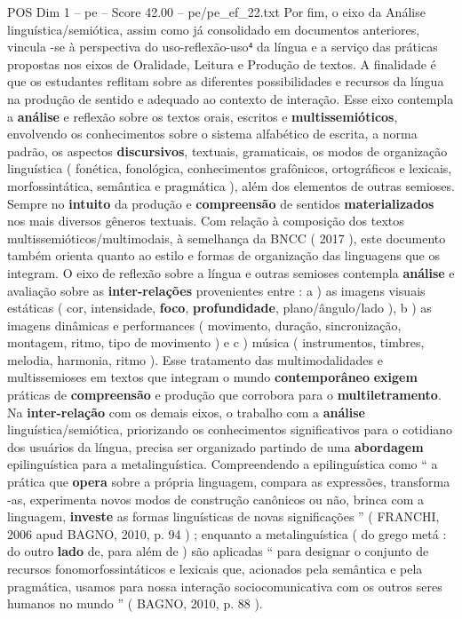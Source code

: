 \begin{textsample}{POS Dim 1 – pe – Score 42.00 – pe/pe\_ef\_22.txt}
Por fim, o eixo da Análise linguística/semiótica, assim como já consolidado em documentos anteriores, vincula -se à perspectiva do uso-reflexão-uso⁴ da língua e a serviço das práticas propostas nos eixos de Oralidade, Leitura e Produção de textos.
A finalidade é que os estudantes reflitam sobre as diferentes possibilidades e recursos da língua na produção de sentido e adequado ao contexto de interação.
Esse eixo contempla a \textbf{análise} e reflexão sobre os textos orais, escritos e \textbf{multissemióticos}, envolvendo os conhecimentos sobre o sistema alfabético de escrita, a norma padrão, os aspectos \textbf{discursivos}, textuais, gramaticais, os modos de organização linguística ( fonética, fonológica, conhecimentos grafônicos, ortográficos e lexicais, morfossintática, semântica e pragmática ), além dos elementos de outras semioses.
Sempre no \textbf{intuito} da produção e \textbf{compreensão} de sentidos \textbf{materializados} nos mais diversos gêneros textuais.
Com relação à composição dos textos multissemióticos/multimodais, à semelhança da BNCC ( 2017 ), este documento também orienta quanto ao estilo e formas de organização das linguagens que os integram.
O eixo de reflexão sobre a língua e outras semioses contempla \textbf{análise} e avaliação sobre as \textbf{inter-relações} provenientes entre : a ) as imagens visuais estáticas ( cor, intensidade, \textbf{foco}, \textbf{profundidade}, plano/ângulo/lado ), b ) as imagens dinâmicas e performances ( movimento, duração, sincronização, montagem, ritmo, tipo de movimento ) e c ) música ( instrumentos, timbres, melodia, harmonia, ritmo ).
Esse tratamento das multimodalidades e multissemioses em textos que integram o mundo \textbf{contemporâneo} \textbf{exigem} práticas de \textbf{compreensão} e produção que corrobora para o \textbf{multiletramento}.
Na \textbf{inter-relação} com os demais eixos, o trabalho com a \textbf{análise} linguística/semiótica, priorizando os conhecimentos significativos para o cotidiano dos usuários da língua, precisa ser organizado partindo de uma \textbf{abordagem} epilinguística para a metalinguística.
Compreendendo a epilinguística como “ a prática que \textbf{opera} sobre a própria linguagem, compara as expressões, transforma -as, experimenta novos modos de construção canônicos ou não, brinca com a linguagem, \textbf{investe} as formas linguísticas de novas significações ” ( FRANCHI, 2006 apud BAGNO, 2010, p. 94 ) ; enquanto a metalinguística ( do grego metá : do outro \textbf{lado} de, para além de ) são aplicadas “ para designar o conjunto de recursos fonomorfossintáticos e lexicais que, acionados pela semântica e pela pragmática, usamos para nossa interação sociocomunicativa com os outros seres humanos no mundo ” ( BAGNO, 2010, p. 88 ).

\end{textsample}
